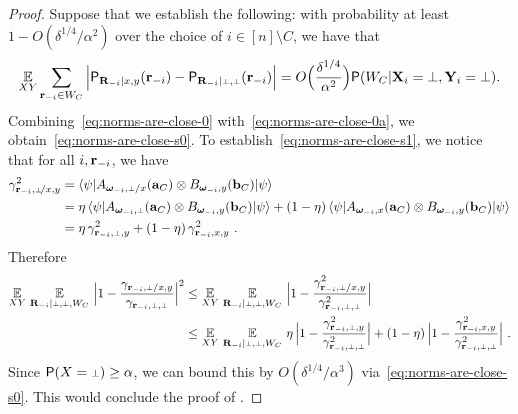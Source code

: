 \begin{proof}
Suppose that we establish the following: with probability at least $1 - O(\delta^{1/4}/\alpha^2)$ over the choice of $i \in [n] \setminus C$, we have that
\begin{equation}
\label{eq:norms-are-close-0}
\Ex_{XY} \sum_{\br_\mi \in W_C}  \Big | \P_{\bR_\mi | x,y}(\br_\mi) - \P_{\bR_\mi | \dummy, \dummy}(\br_\mi) \Big | = O\Big(\frac{\delta^{1/4}}{\alpha^2}\Big) \P(W_C | \bX_i = \dummy, \bY_i = \dummy).
\end{equation}
Combining~\eqref{eq:norms-are-close-0} with~\eqref{eq:norms-are-close-0a}, we obtain~\eqref{eq:norms-are-close-s0}. To establish~\eqref{eq:norms-are-close-s1}, we notice that for all $i, \mathbf{r}_{-i}$, we have
\begin{align*}
	\gamma_\sspxy^2 &= \bra{\psi} A_{\bomega_\mi,\dummy/x}(\ba_C) \otimes B_{\bomega_\mi,y}(\bb_C) \ket{\psi} \\
	&= \eta \, \bra{\psi} A_{\bomega_\mi,\dummy}(\ba_C) \otimes B_{\bomega_\mi,y}(\bb_C) \ket{\psi} + (1 - \eta) \, \bra{\psi} A_{\bomega_\mi,x}(\ba_C) \otimes B_{\bomega_\mi,y}(\bb_C) \ket{\psi} \\
	&= \eta \, \gamma_\sspy^2 + (1 - \eta) \,\gamma_\ssxy^2~.
\end{align*}
Therefore
\begin{align*}
\Ex_{XY} \, \Ex_{\bR_\mi | \dummy, \dummy, W_C} \, \Big | 1 - \frac{\gamma_{\br_\mi, \dummy/x,y}}{\gamma_{\br_\mi,\dummy,\dummy}} \Big |^2 &\leq \Ex_{XY} \, \Ex_{\bR_\mi | \dummy, \dummy, W_C} \, \Big | 1 - \frac{\gamma_{\br_\mi, \dummy/x,y}^2}{\gamma_{\br_\mi,\dummy,\dummy}^2} \Big | \\
&\leq \Ex_{XY} \, \Ex_{\bR_\mi | \dummy, \dummy, W_C} \, \eta \,\Big | 1 - \frac{\gamma_{\br_\mi, \dummy ,y}^2}{\gamma_{\br_\mi,\dummy,\dummy}^2} \Big |+(1 - \eta)\,\Big | 1 - \frac{\gamma_{\br_\mi, x,y}^2}{\gamma_{\br_\mi,\dummy,\dummy}^2} \Big |~.
\end{align*}
Since $\P(X = \dummy) \geq \alpha$, we can bound this by $O(\delta^{1/4}/\alpha^3)$ via~\eqref{eq:norms-are-close-s0}. This would conclude the proof of . 


\end{proof}
